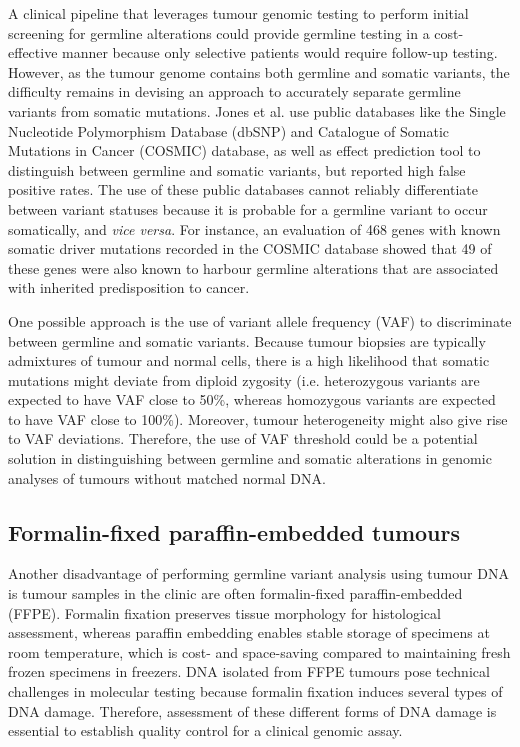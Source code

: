 A clinical pipeline that leverages tumour genomic testing to perform initial screening for germline alterations could provide germline testing in a cost-effective manner because only selective patients would require follow-up testing. However, as the tumour genome contains both germline and somatic variants, the difficulty remains in devising an approach to accurately separate germline variants from somatic mutations. Jones et al. \cite{Jones2015a} use public databases like the Single Nucleotide Polymorphism Database (dbSNP) and Catalogue of Somatic Mutations in Cancer (COSMIC) database, as well as effect prediction tool to distinguish between germline and somatic variants, but reported high false positive rates. The use of these public databases cannot reliably differentiate between variant statuses because it is probable for a germline variant to occur somatically, and \textit{vice versa}. For instance, an evaluation of 468 genes with known somatic driver mutations recorded in the COSMIC database showed that 49 of these genes were also known to harbour germline alterations that are associated with inherited predisposition to cancer.

One possible approach is the use of variant allele frequency (VAF) to discriminate between germline and somatic variants. Because tumour biopsies are typically admixtures of tumour and normal cells, there is a high likelihood that somatic mutations might deviate from diploid zygosity (i.e. heterozygous variants are expected to have VAF close to 50\%, whereas homozygous variants are expected to have VAF close to 100\%). Moreover, tumour heterogeneity might also give rise to VAF deviations. Therefore, the use of VAF threshold could be a potential solution in distinguishing between germline and somatic alterations in genomic analyses of tumours without matched normal DNA.

\subsection{Formalin-fixed paraffin-embedded tumours}

Another disadvantage of performing germline variant analysis using tumour DNA is tumour samples in the clinic are often formalin-fixed paraffin-embedded (FFPE). Formalin fixation preserves tissue morphology for histological assessment, whereas paraffin embedding enables stable storage of specimens at room temperature, which is cost- and space-saving compared to maintaining fresh frozen specimens in freezers. DNA isolated from FFPE tumours pose technical challenges in molecular testing because formalin fixation induces several types of DNA damage. Therefore, assessment of these different forms of DNA damage is essential to establish quality control for a clinical genomic assay.

